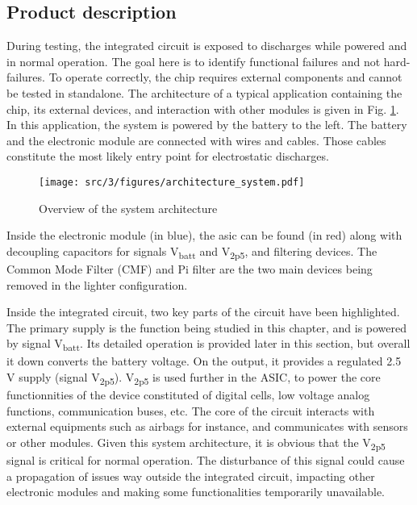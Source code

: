 \subsection{Product description}
\label{sec:product-desc}

During testing, the integrated circuit is exposed to discharges while powered and in normal operation.
The goal here is to identify functional failures and not hard-failures.
To operate correctly, the chip requires external components and cannot be tested in standalone.
The architecture of a typical application containing the chip, its external devices, and interaction with other modules is given in Fig. \ref{fig:system_architecture}.
In this application, the system is powered by the battery to the left.
The battery and the electronic module are connected with wires and cables.
Those cables constitute the most likely entry point for electrostatic discharges.

\begin{figure}[!h]
  \centering
  \texttt{[image: src/3/figures/architecture\_system.pdf]}
  \caption{Overview of the system architecture}
  \label{fig:system_architecture}
\end{figure}

Inside the electronic module (in blue), the \gls{asic} can be found (in red) along with decoupling capacitors for signals V\textsubscript{batt} and V\textsubscript{2p5}, and filtering devices.
The Common Mode Filter (CMF) and Pi filter are the two main devices being removed in the lighter configuration.

Inside the integrated circuit, two key parts of the circuit have been highlighted.
The primary supply is the function being studied in this chapter, and is powered by signal V\textsubscript{batt}.
Its detailed operation is provided later in this section, but overall it down converts the battery voltage.
On the output, it provides a regulated 2.5 V supply (signal V\textsubscript{2p5}).
V\textsubscript{2p5} is used further in the ASIC, to power the core functionnities of the device constituted of digital cells, low voltage analog functions, communication buses, etc.
The core of the circuit interacts with external equipments such as airbags for instance, and communicates with sensors or other modules.
Given this system architecture, it is obvious that the V\textsubscript{2p5} signal is critical for normal operation.
The disturbance of this signal could cause a propagation of issues way outside the integrated circuit, impacting other electronic modules and making some functionalities temporarily unavailable.

